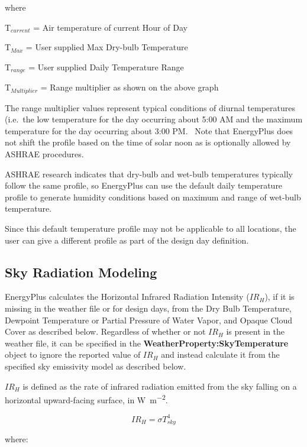 where

T\(_{current}\) = Air temperature of current Hour of Day

T\(_{Max}\) = User supplied Max Dry-bulb Temperature

T\(_{range}\) = User supplied Daily Temperature Range

T\(_{Multiplier}\) = Range multiplier as shown on the above graph

The range multiplier values represent typical conditions of diurnal temperatures (i.e.~the low temperature for the day occurring about 5:00 AM and the maximum temperature for the day occurring about 3:00 PM.~ Note that EnergyPlus does not shift the profile based on the time of solar noon as is optionally allowed by ASHRAE procedures.

ASHRAE research indicates that dry-bulb and wet-bulb temperatures typically follow the same profile, so EnergyPlus can use the default daily temperature profile to generate humidity conditions based on maximum and range of wet-bulb temperature.

Since this default temperature profile may not be applicable to all locations, the user can give a different profile as part of the design day definition.

\subsection{Sky Radiation Modeling}\label{sky-radiation-modeling}

EnergyPlus calculates the Horizontal Infrared Radiation Intensity ($IR_H$), if it is missing in the weather file or for design days, from the Dry Bulb Temperature, Dewpoint Temperature or Partial Pressure of Water Vapor, and Opaque Cloud Cover as described below. Regardless of whether or not $IR_H$ is present in the weather file, it can be specified in the \textbf{WeatherProperty:SkyTemperature} object to ignore the reported value of $IR_H$ and instead calculate it from the specified sky emissivity model as described below.

$IR_H$ is defined as the rate of infrared radiation emitted from the sky falling on a horizontal upward-facing surface, in \si{\watt\per\m\squared}.

\begin{equation}
IR_H = \sigma T_{sky}^4
\end{equation}

\noindent where:
\newline

